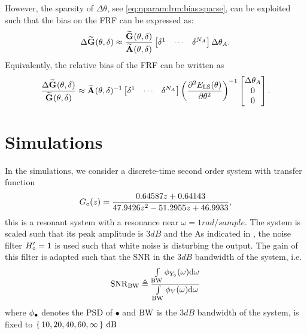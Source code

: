 However, the sparsity of $\Delta\theta$, see \eqref{eq:nparam:lrm:bias:sparse}, can be exploited such that the bias on the \gls{FRF} can be expressed as:
\begin{equation}
  \Delta \LocalModel{G}(\theta,\dW)
  \approx
  \frac{\LocalModel{G}(\theta, \dW)}
           {\LocalModel{A}(\theta, \dW)}
  \begin{bmatrix}
    \dW^1 & \deemph{\cdots} & \dW^{\order{A}}
  \end{bmatrix}
  \Delta \theta_A
  \text{.}
\end{equation}
Equivalently, the relative bias of the \gls{FRF} can be written as
\begin{equation}
\frac{\Delta \LocalModel{G}(\theta,\dW)}{\LocalModel{G}(\theta,\dW)}
\approx
\LocalModel{A}(\theta,\dW)^{-1}
\begin{bmatrix}
    \dW^1 & \deemph{\cdots} & \dW^{\order{A}}
  \end{bmatrix}
  \left(  \PartialDerivative[2]{\ELSCost{\theta}}{ \theta^2 } \right)^{-1}
  \begin{bmatrix}
  \Delta\theta_A\\
  0\\
  0\\
  \end{bmatrix}
  \text{.}
\end{equation}


\section{Simulations}
\label{sec:simulations}

In the simulations, we consider a discrete-time second order system with transfer function
\begin{equation}
{G}_{\circ}(z) = \frac{0.64587 z + 0.64143}
                                      {47.9426 z^2 - 51.2955 z + 46.9933}
                                      \text{,}
\end{equation}
this is a resonant system with a resonance near $\omega=1\unit{rad/sample}$.
The system is scaled such that its peak amplitude is $3\unit{dB}$ and the 
As indicated in , the noise filter ${H}_{\circ}' = 1$ is used such that white noise is disturbing the output.
The gain of this filter is adapted such that the \gls{SNR} in the $3\unit{dB}$ bandwidth of the system, i.e.
\begin{equation}
  \mathrm{SNR}_{\mathrm{BW}} \triangleq
  \frac{\int\limits_{\mathrm{BW}} \phi_{{Y}_{\circ}}(\omega) \mathrm{d}\omega}
            {\int\limits_{\mathrm{BW}} \phi_{V}(\omega) \mathrm{d}{\omega}}
\end{equation}
where $\phi_{\bullet}$ denotes the \gls{PSD} of $\bullet$ and $\mathrm{BW}$ is the $3 \unit{dB}$ bandwidth of the system, is fixed to $\set{10, 20, 40, 60, \infty} \,\mathrm{dB}$ 


